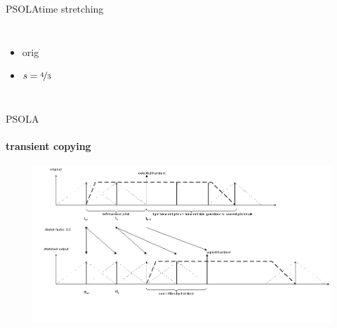\begin{frame}{PSOLA}{time stretching}
\begin{columns}
                \column{4cm}\vspace{-20mm}
                    \begin{itemize}
                        \item orig  
                        \item $s = \nicefrac{4}{3}$ 
                    \end{itemize}
            \end{columns}
            \vspace{50mm}
    \end{frame}
\begin{frame}{PSOLA}\framesubtitle{transient copying}
				\begin{figure}
					\centerline{\includegraphics[scale=.3]{graph/transcpy}}
				\end{figure}
\end{frame}

